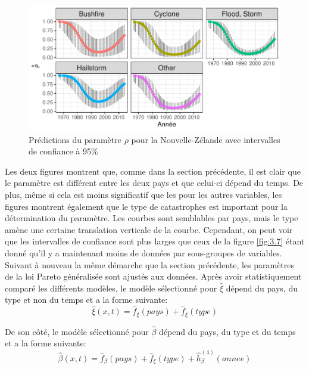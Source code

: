 \begin{figure}[h]
\begin{center}
\includegraphics{images/fig-024}
\end{center}
\caption{Prédictions du paramètre $\rho$ pour la Nouvelle-Zélande avec intervalles de confiance à 95\%}
\label{fig:3.13}
\end{figure}

Les deux figures montrent que, comme dans la section précédente, il est clair que le paramètre est différent entre les deux pays et que celui-ci dépend du temps. De plus, même si cela est moins significatif que les pour les autres variables, les figures montrent également que le type de catastrophes est important pour la détermination du paramètre. Les courbes sont semblables par pays, mais le type amène une certaine translation verticale de la courbe. Cependant, on peut voir que les intervalles de confiance sont plus larges que ceux de la figure \ref{fig:3.7} étant donné qu'il y a maintenant moins de données par sous-groupes de variables.
\\

Suivant à nouveau la même démarche que la section précédente, les paramètres de la loi Pareto généralisée sont ajustés aux données. Après avoir statistiquement comparé les différents modèles, le modèle sélectionné pour $\hat\xi$ dépend du pays, du type et non du temps et a la forme suivante:
\begin{equation}\label{eq:3.4.2}
\hat\xi(x,t) = \hat{f}_\xi(pays) + \hat{f}_\xi(type)
\end{equation}

De son côté, le modèle sélectionné pour $\hat\beta$ dépend du pays, du type et du temps et a la forme suivante:
\begin{equation}\label{eq:3.4.3}
\hat\beta(x,t) = \hat{f}_\beta(pays) + \hat{f}_\xi(type) + \hat{h}^{(4)}_\beta(annee)
\end{equation}



